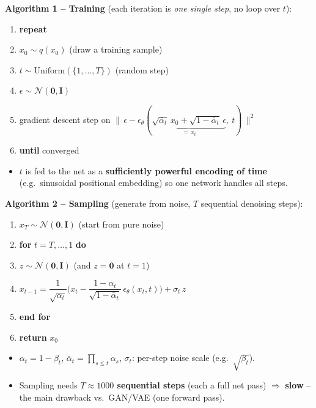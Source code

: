 \documentclass[10pt,a4paper]{article}
\begin{document}
	\begin{formulabox}
		\textbf{Algorithm 1 -- Training} (each iteration is \emph{one single step}, no loop over $t$):
		\begin{enumerate}[leftmargin=2em, itemsep=1pt]
			\item \textbf{repeat}
			\item \quad $x_0 \sim q(x_0)$ \hfill {\scriptsize(draw a training sample)}
			\item \quad $t \sim \mathrm{Uniform}(\{1,\dots,T\})$ \hfill {\scriptsize(random step)}
			\item \quad $\epsilon \sim \mathcal{N}(\mathbf{0},\mathbf{I})$
			\item \quad gradient descent step on $\big\|\,\epsilon - \epsilon_\theta(\underbrace{\sqrt{\bar\alpha_t}\,x_0 + \sqrt{1-\bar\alpha_t}\,\epsilon}_{=\,x_t},\ t)\,\big\|^2$
			\item \textbf{until} converged
		\end{enumerate}
	\end{formulabox}
	\begin{itemize}[leftmargin=*]
		\item $t$ is fed to the net as a \textbf{sufficiently powerful encoding of time} (e.g.\ sinusoidal positional embedding) so one network handles all steps.
	\end{itemize}

	\begin{formulabox}
		\textbf{Algorithm 2 -- Sampling} (generate from noise, $T$ sequential denoising steps):
		\begin{enumerate}[leftmargin=2em, itemsep=1pt]
			\item $x_T \sim \mathcal{N}(\mathbf{0},\mathbf{I})$ \hfill {\scriptsize(start from pure noise)}
			\item \textbf{for} $t = T,\dots,1$ \textbf{do}
			\item \quad $z \sim \mathcal{N}(\mathbf{0},\mathbf{I})$ \; (and $z=\mathbf{0}$ at $t=1$)
			\item \quad $x_{t-1} = \dfrac{1}{\sqrt{\alpha_t}}\Big(x_t - \dfrac{1-\alpha_t}{\sqrt{1-\bar\alpha_t}}\,\epsilon_\theta(x_t,t)\Big) + \sigma_t\, z$
			\item \textbf{end for}
			\item \textbf{return} $x_0$
		\end{enumerate}
	\end{formulabox}
	\begin{itemize}[leftmargin=*]
		\item $\alpha_t = 1-\beta_t$, \; $\bar\alpha_t = \prod_{s\le t}\alpha_s$, \; $\sigma_t$: per-step noise scale (e.g.\ $\sqrt{\beta_t}$).
		\item Sampling needs \textbf{$T\approx1000$ sequential steps} (each a full net pass) $\Rightarrow$ \textbf{slow} -- the main drawback vs.\ GAN/VAE (one forward pass).
	\end{itemize}
\end{document}
